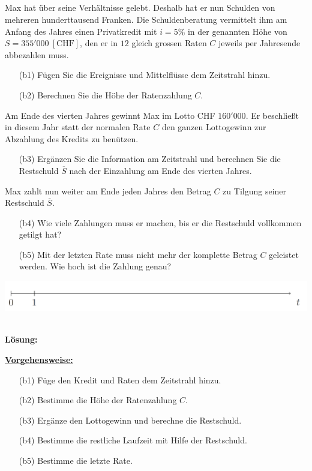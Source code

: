 \subsection*{}
Max hat über seine Verhältnisse gelebt. 
Deshalb hat er nun Schulden von mehreren hunderttausend Franken.
Die Schuldenberatung vermittelt ihm am Anfang des Jahres einen Privatkredit mit $ i = 5 \% $ in der genannten Höhe von $ S = 355'000 \ [\textrm{CHF}] $, den er in $ 12 $ gleich grossen Raten $ C $ jeweils per Jahresende abbezahlen muss. 
\begin{enumerate}
	\item[(b1)] Fügen Sie die Ereignisse und Mittelflüsse dem Zeitstrahl hinzu.
	\item[(b2)] Berechnen Sie die Höhe der Ratenzahlung $ C $.
\end{enumerate}
Am Ende des vierten Jahres gewinnt Max im Lotto CHF $ 160'000 $.
Er beschließt in diesem Jahr statt der normalen Rate $ C $ den ganzen Lottogewinn zur Abzahlung des Kredits zu benützen.
\begin{enumerate}
	\item[(b3)] Ergänzen Sie die Information am Zeitstrahl und berechnen Sie die Restschuld $ \overline{S} $ nach der Einzahlung am Ende des vierten Jahres.
\end{enumerate}
Max zahlt nun weiter am Ende jeden Jahres den Betrag $ C $ zu Tilgung seiner Restschuld $ \overline{S} $.
\begin{enumerate}
	\item[(b4)] Wie viele Zahlungen muss er machen, bis er die Restschuld vollkommen getilgt hat?
	\item[(b5)] Mit der letzten Rate muss nicht mehr der komplette Betrag $ C $ geleistet werden. Wie hoch ist die Zahlung genau?
\end{enumerate}
\begin{center}
	\includegraphics[scale=0.3]{pictures/zeitstrahl_1_b}
\end{center}
\ \\
\textbf{Lösung:}
\begin{mdframed}
\underline{\textbf{Vorgehensweise:}}
\begin{enumerate}
\item[(b1)] Füge den Kredit und Raten dem Zeitstrahl hinzu.
\item[(b2)] Bestimme die Höhe der Ratenzahlung $ C $.
\item[(b3)] Ergänze den Lottogewinn und berechne die Restschuld.
\item[(b4)] Bestimme die restliche Laufzeit mit Hilfe der Restschuld.
\item[(b5)] Bestimme die letzte Rate.
\end{enumerate}
\end{mdframed}

